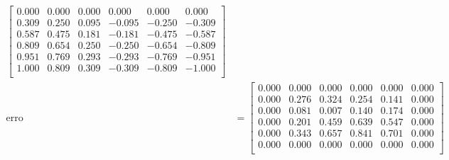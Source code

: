 \documentclass[a4paper, 11pt]{report}
\begin{document}
\begin{enumerate}[leftmargin=*]
\begin{enumerate}[leftmargin=*, label=\alph*.]
\begin{minipage}{0.6\columnwidth}
\begin{align*}
{\begin{bmatrix}
                    0.000 & 0.000 & 0.000 & 0.000 & 0.000 & 0.000 \\
                    0.309 & 0.250 & 0.095 &-0.095 &-0.250 &-0.309 \\
                    0.587 & 0.475 & 0.181 &-0.181 &-0.475 &-0.587 \\
                    0.809 & 0.654 & 0.250 &-0.250 &-0.654 &-0.809 \\
                    0.951 & 0.769 & 0.293 &-0.293 &-0.769 &-0.951 \\
                    1.000 & 0.809 & 0.309 &-0.309 &-0.809 &-1.000 \\
                \end{bmatrix}}\\
                \text{erro} &= 
                \begin{bmatrix}
                    0.000 & 0.000 & 0.000 & 0.000 & 0.000 & 0.000 \\
                    0.000 & 0.276 & 0.324 & 0.254 & 0.141 & 0.000 \\
                    0.000 & 0.081 & 0.007 & 0.140 & 0.174 & 0.000 \\
                    0.000 & 0.201 & 0.459 & 0.639 & 0.547 & 0.000 \\
                    0.000 & 0.343 & 0.657 & 0.841 & 0.701 & 0.000 \\
                    0.000 & 0.000 & 0.000 & 0.000 & 0.000 & 0.000 \\
                \end{bmatrix}
            \end{align*}
        \end{minipage}
    \end{enumerate}
\end{enumerate}
\end{document}

